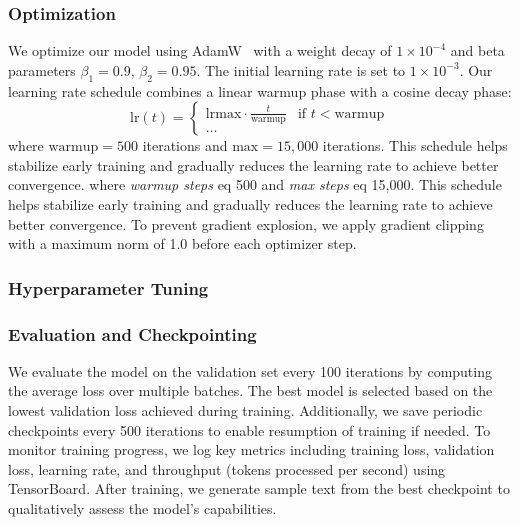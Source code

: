 \subsubsection{Optimization}
We optimize our model using AdamW~\cite{loshchilov2018decoupled} with a weight decay of $1 \times 10^{-4}$ and beta parameters $\beta_1 = 0.9$, $\beta_2 = 0.95$. The initial learning rate is set to $1 \times 10^{-3}$.
Our learning rate schedule combines a linear warmup phase with a cosine decay phase:
\begin{equation}
\text{lr}(t) =
\begin{cases}
\text{lr}{\text{max}} \cdot \frac{t}{\text{warmup}} & \text{if } t < \text{warmup} \\
\ldots
\end{cases}
\end{equation}
\noindent where $\text{warmup} = 500$ iterations and $\text{max} = 15,000$ iterations. This schedule helps stabilize early training and gradually reduces the learning rate to achieve better convergence.
\noindent where \textit{warmup steps} eq 500 and \textit{max steps} eq 15,000. This schedule helps stabilize early training and gradually reduces the learning rate to achieve better convergence.
To prevent gradient explosion, we apply gradient clipping with a maximum norm of 1.0 before each optimizer step.
\subsubsection{Hyperparameter Tuning}

\subsubsection{Evaluation and Checkpointing}
We evaluate the model on the validation set every 100 iterations by computing the average loss over multiple batches. The best model is selected based on the lowest validation loss achieved during training. Additionally, we save periodic checkpoints every 500 iterations to enable resumption of training if needed.
To monitor training progress, we log key metrics including training loss, validation loss, learning rate, and throughput (tokens processed per second) using TensorBoard. After training, we generate sample text from the best checkpoint to qualitatively assess the model's capabilities.